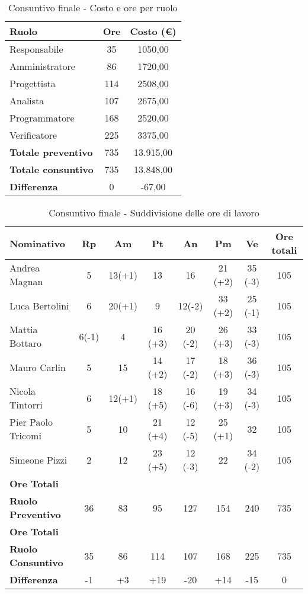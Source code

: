 \documentclass[./PianoDiProgetto.tex]{subfiles}
\begin{document}
\begin{table}[H]
		\centering

		\begin{tabular}{l * {2}{c}}
			\toprule
			\textbf{Ruolo} & \textbf{Ore} & \textbf{Costo (\euro{})} \\
			\midrule
			Responsabile & 35 & 1050,00 \\
			Amministratore  & 86 & 1720,00 \\
			Progettista  & 114 & 2508,00 \\
			Analista & 107 & 2675,00 \\
			Programmatore  & 168 &  2520,00 \\
			Verificatore  & 225 &  3375,00 \\
			\midrule
			\textbf{Totale preventivo}  & 735   &  13.915,00 \\
			\textbf{Totale consuntivo}  & 735   &  13.848,00 \\
			\midrule
			\textbf{Differenza}  & 0  &  -67,00 \\
			\bottomrule
		\end{tabular}
		\caption{Consuntivo finale - Costo e ore per ruolo}
	\end{table}


\begin{table}[H]
\centering
		\begin{tabularx}{\textwidth}{l  * {6}{c}  c}
			\toprule
			\textbf{Nominativo} & \textbf{Rp} & \textbf{Am} & \textbf{Pt}
						& \textbf{An} & \textbf{Pm} & \textbf{Ve} & \textbf{Ore totali} \\
			\midrule
			Andrea Magnan  & 5  & 13(+1) & 13 & 16 & 21 (+2)  & 35 (-3)& 105 \\
			Luca Bertolini  & 6 & 20(+1) & 9 & 12(-2) & 33 (+2) & 25 (-1) & 105 \\
			Mattia Bottaro  & 6(-1)  & 4 & 16 (+3) & 20 (-2) & 26 (+3)  & 33 (-3) & 105 \\
			Mauro Carlin  & 5 & 15 & 14 (+2) & 17 (-2) & 18 (+3) & 36 (-3) & 105 \\
			Nicola Tintorri  & 6 & 12(+1) & 18 (+5) & 16 (-6) & 19 (+3) & 34 (-3) & 105 \\
			Pier Paolo Tricomi  & 5 & 10 & 21 (+4) & 12 (-5) & 25 (+1) & 32 & 105 \\
			Simeone Pizzi & 2 & 12 & 23 (+5) & 12 (-3) & 22 & 34 (-2) & 105 \\
			\midrule
			\textbf{Ore Totali} \\ \textbf{Ruolo Preventivo} & 36    & 83   & 95   & 127   & 154 & 240   & 735 \\
			\midrule
			\textbf{Ore Totali} \\ \textbf{Ruolo Consuntivo} & 35    & 86   & 114   & 107   & 168 & 225  & 735 \\
			\midrule
			\textbf{Differenza} & -1 & +3   & +19   & -20   & +14 & -15   & 0 \\
			\bottomrule
		\end{tabularx}
		\caption{Consuntivo finale - Suddivisione delle ore di lavoro}
	\end{table}
	
\end{document}
